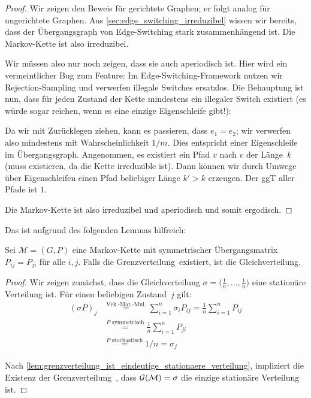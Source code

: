 \begin{proof}
    Wir zeigen den Beweis für gerichtete Graphen; er folgt analog für ungerichtete Graphen.
Aus \cref{sec:edge_switching_irreduzibel} wissen wir bereits, dass der Übergangsgraph von Edge-Switching stark zusammenhängend ist.
    Die Markov-Kette ist also irreduzibel.

    Wir müssen also nur noch zeigen, dass sie auch aperiodisch ist.
    Hier wird ein vermeintlicher Bug zum Feature:
    Im Edge-Switching-Framework nutzen wir Rejection-Sampling und verwerfen illegale Switches ersatzlos.
    Die Behauptung ist nun, dass für jeden Zustand der Kette mindestens ein illegaler Switch existiert (es würde sogar reichen, wenn es eine einzige Eigenschleife gibt!):

Da wir mit Zurücklegen ziehen, kann es passieren, dass $e_1 = e_2$; wir verwerfen also mindestens mit Wahrscheinlichkeit $1 / m$.
    Dies entspricht einer Eigenschleife im Übergangsgraph.
    Angenommen, es existiert ein Pfad $v$ nach $v$ der Länge~$k$ (muss existieren, da die Kette irreduzible ist).
    Dann können wir durch Umwege über Eigenschleifen einen Pfad beliebiger Länge $k' > k$ erzeugen.
    Der ggT aller Pfade ist $1$.

    Die Markov-Kette ist also irreduzibel und aperiodisch und somit ergodisch.
\end{proof}

Das ist aufgrund des folgenden Lemmas hilfreich:
\begin{lemma}
    Sei $\mathcal M = (G, P)$ eine Markov-Kette mit symmetrischer Übergangsmatrix $P_{ij} = P_{ji}$ für alle $i, j$.
Falls die Grenzverteilung~\grenz existiert, ist \grenz die Gleichverteilung.
\end{lemma}

\begin{proof}
Wir zeigen zunächst, dass die Gleichverteilung $\sigma = \bigl(\frac{1}{n}, \ldots, \allowbreak \frac{1}{n}\bigr)$ eine stationäre Verteilung ist.
Für einen beliebigen Zustand~$j$ gilt:
    \begin{align}
        (\sigma P) _ j & \stackrel{\text{Vek.-Mat.-Mul.}}{=} \sum_{i=1}^n \sigma_i P_{ij}
        = \frac 1 n \sum_{i=1}^n P_{ij}                                                   \\
                       & \stackrel{P\text{ symmetrisch}}{=} \frac 1 n \sum_{i=1}^n P_{ji} \\
                       & \stackrel{P\text{ stochastisch}}{=} 1 / n = \sigma_j
    \end{align}

Nach \cref{lem:grenzverteilung_ist_eindeutige_stationaere_verteilung}, impliziert die Existenz der Grenzverteilung~\grenz, dass $\mathcal G(\mathcal M) = \sigma$ die einzige stationäre Verteilung ist.
\end{proof}


